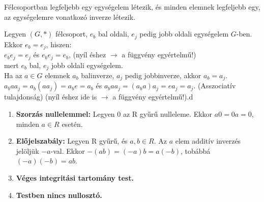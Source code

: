 \begin{frame}[plain]
\end{frame}

\begin{frame}

\begin{tcolorbox}[title={Tétel: Egységelem és inverz félcsoportban}]
Félcsoportban legfeljebb egy egységelem létezik, és minden elemnek legfeljebb egy, az egységelemre vonatkozó inverze létezik.
\end{tcolorbox}

\begin{tcolorbox}[title={Bizonyítás}]
Legyen $(G, *)$ félcsoport, $e_b$ bal oldali, $e_j$ pedig jobb oldali egységelem $G$-ben.\\
Ekkor $e_b = e_j$, hiszen:\\
$e_be_j = e_j$ és $e_be_j = e_b$, (nyíl éshez $\rightarrow$ a függvény egyértelmű!)\\
mert $e_b$ bal, $e_j$ jobb oldali egységelem.\\
Ha az $a \in G$ elemnek $a_b$ balinverze, $a_j$ pedig jobbinverze, akkor $a_b = a_j$.
$a_baa_j = a_b(aa_j) = a_be = a_b$ és $a_baa_j = (a_ba)a_j = ea_j = a_j$. (Asszociatív tulajdonság) (nyíl éshez ide is $\rightarrow$ a függvény egyértelmű!).d
\end{tcolorbox}

\end{frame}

\begin{frame}

\begin{tcolorbox}[title={Lemma: Észrevételek gyűrűkben}]
\begin{enumerate}
\item \textbf{Szorzás nullelemmel:} Legyen 0 az R gyűrű nulleleme. Ekkor $a0 = 0a = 0$, minden $a \in R$ esetén.
\item \textbf{Előjelszabály:} Legyen R gyűrű, és $a, b \in R$. Az $a$ elem additív inverzés jelöljük $-a$-val. Ekkor $-(ab) = (-a)b = a(-b)$, tobábbá $(-a)(-b) = ab$.
\item \textbf{Véges integritási tartomány test.}
\item \textbf{Testben nincs nullosztó.}
\end{enumerate}
\end{tcolorbox}

\end{frame}

